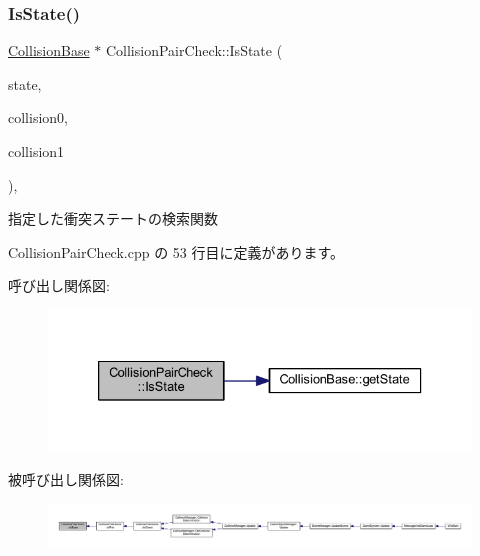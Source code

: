 \subsubsection{\texorpdfstring{Is\+State()}{IsState()}}
{\footnotesize\ttfamily \mbox{\hyperlink{class_collision_base}{Collision\+Base}} $\ast$ Collision\+Pair\+Check\+::\+Is\+State (\begin{DoxyParamCaption}\item[{\mbox{\hyperlink{class_collision_base_a4dd1ed00099a19c0176913af93c4e365}{Collision\+Base\+::\+State}}}]{state,  }\item[{\mbox{\hyperlink{class_collision_base}{Collision\+Base}} $\ast$}]{collision0,  }\item[{\mbox{\hyperlink{class_collision_base}{Collision\+Base}} $\ast$}]{collision1 }\end{DoxyParamCaption})\hspace{0.3cm}{\ttfamily [static]}, {\ttfamily [private]}}



指定した衝突ステートの検索関数 



 Collision\+Pair\+Check.\+cpp の 53 行目に定義があります。

呼び出し関係図\+:\nopagebreak
\begin{figure}[H]
\begin{center}
\leavevmode
\includegraphics[width=333pt]{class_collision_pair_check_ab0f449965867269dc3115e831547a869_cgraph}
\end{center}
\end{figure}
被呼び出し関係図\+:
\nopagebreak
\begin{figure}[H]
\begin{center}
\leavevmode
\includegraphics[width=350pt]{class_collision_pair_check_ab0f449965867269dc3115e831547a869_icgraph}
\end{center}
\end{figure}
\mbox{\label{class_collision_pair_check_a32ebe7303801a6bfa9225c60ddb4b749}} 
